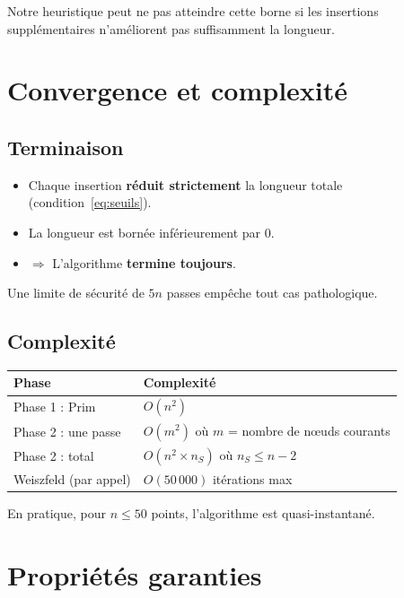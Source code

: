 \documentclass[12pt,a4paper]{article}
\begin{document}
Notre heuristique peut ne pas atteindre cette borne si les insertions
supplémentaires n'améliorent pas suffisamment la longueur.

\section{Convergence et complexité}

\subsection{Terminaison}

\begin{itemize}
  \item Chaque insertion \textbf{réduit strictement} la longueur totale
        (condition~\ref{eq:seuils}).
  \item La longueur est bornée inférieurement par $0$.
  \item $\Rightarrow$ L'algorithme \textbf{termine toujours}.
\end{itemize}

Une limite de sécurité de $5n$ passes empêche tout cas pathologique.

\subsection{Complexité}

\begin{tabular}{ll}
\hline
Phase & Complexité \\
\hline
Phase 1 : Prim & $O(n^2)$ \\
Phase 2 : une passe & $O(m^2)$ où $m$ = nombre de nœuds courants \\
Phase 2 : total & $O(n^2 \times n_S)$ où $n_S \leq n-2$ \\
Weiszfeld (par appel) & $O(50\,000)$ itérations max \\
\hline
\end{tabular}

\medskip
En pratique, pour $n \leq 50$ points, l'algorithme est quasi-instantané.

\section{Propriétés garanties}
\end{document}
